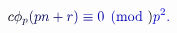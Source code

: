 \documentclass[12pt]{article}
\begin{document}
\makeatletter
\renewcommand*{\@textcolor}[3]{%
  \protect\leavevmode
  \begingroup
    \color#1{#2}#3%
  \endgroup
}
\makeatother
\begin{displaymath}
\mathcolor[RGB]{0,0,15}{c} \mathcolor[RGB]{0,0,30}{\phi} _ { \mathcolor[RGB]{0,0,45}{p} } \mathcolor[RGB]{0,0,60}{(} \mathcolor[RGB]{0,0,75}{p} \mathcolor[RGB]{0,0,90}{n} \mathcolor[RGB]{0,0,105}{+} \mathcolor[RGB]{0,0,120}{r} \mathcolor[RGB]{0,0,135}{)} \mathcolor[RGB]{0,0,150}{\equiv} \mathcolor[RGB]{0,0,165}{0} \mathcolor[RGB]{0,0,180}{\pmod} { \mathcolor[RGB]{0,0,195}{p} ^ { \mathcolor[RGB]{0,0,210}{2} } } \mathcolor[RGB]{0,0,225}{.}
\end{displaymath}
\end{document}
